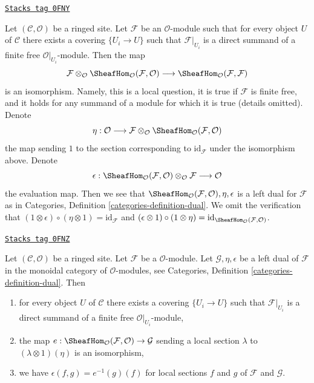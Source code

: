 \begin{example}[Dual]
\label{sites-modules-example-dual}
\href{https://stacks.math.columbia.edu/tag/0FNY}{\texttt{Stacks tag 0FNY}}

Let $(\mathcal{C}, \mathcal{O})$ be a ringed site. Let $\mathcal{F}$
be an $\mathcal{O}$-module such that for every object $U$ of $\mathcal{C}$
there exists a covering $\{U_i \to U\}$ such that $\mathcal{F}|_{U_i}$
is a direct summand of a finite free $\mathcal{O}|_{U_i}$-module.
Then the map
$$
\mathcal{F} \otimes_\mathcal{O}
\SheafHom_\mathcal{O}(\mathcal{F}, \mathcal{O})
\longrightarrow
\SheafHom_\mathcal{O}(\mathcal{F}, \mathcal{F})
$$
is an isomorphism. Namely, this is a local question, it is true
if $\mathcal{F}$ is finite free, and it holds for any summand
of a module for which it is true (details omitted). Denote
$$
\eta :
\mathcal{O}
\longrightarrow
\mathcal{F} \otimes_\mathcal{O}
\SheafHom_\mathcal{O}(\mathcal{F}, \mathcal{O})
$$
the map sending $1$ to the section corresponding to
$\text{id}_\mathcal{F}$ under the isomorphism above.
Denote
$$
\epsilon :
\SheafHom_\mathcal{O}(\mathcal{F}, \mathcal{O})
\otimes_\mathcal{O} \mathcal{F}
\longrightarrow
\mathcal{O}
$$
the evaluation map. Then we see that
$\SheafHom_\mathcal{O}(\mathcal{F}, \mathcal{O}), \eta, \epsilon$
is a left dual for $\mathcal{F}$ as in
Categories, Definition \ref{categories-definition-dual}.
We omit the verification that
$(1 \otimes \epsilon) \circ (\eta \otimes 1) = \text{id}_\mathcal{F}$
and
$(\epsilon \otimes 1) \circ (1 \otimes \eta) =
\text{id}_{\SheafHom_\mathcal{O}(\mathcal{F}, \mathcal{O})}$.
\end{example}

\begin{lemma}
\label{sites-modules-lemma-left-dual-module}
\href{https://stacks.math.columbia.edu/tag/0FNZ}{\texttt{Stacks tag 0FNZ}}

Let $(\mathcal{C}, \mathcal{O})$ be a ringed site. Let $\mathcal{F}$ be a
$\mathcal{O}$-module. Let $\mathcal{G}, \eta, \epsilon$
be a left dual of $\mathcal{F}$ in the monoidal category of
$\mathcal{O}$-modules, see
Categories, Definition \ref{categories-definition-dual}. Then
\begin{enumerate}
\item for every object $U$ of $\mathcal{C}$
there exists a covering $\{U_i \to U\}$ such that $\mathcal{F}|_{U_i}$
is a direct summand of a finite free $\mathcal{O}|_{U_i}$-module,
\item the map
$e : \SheafHom_\mathcal{O}(\mathcal{F}, \mathcal{O}) \to \mathcal{G}$
sending a local section $\lambda$ to $(\lambda \otimes 1)(\eta)$
is an isomorphism,
\item we have $\epsilon(f, g) = e^{-1}(g)(f)$ for local sections
$f$ and $g$ of $\mathcal{F}$ and $\mathcal{G}$.
\end{enumerate}
\end{lemma}

